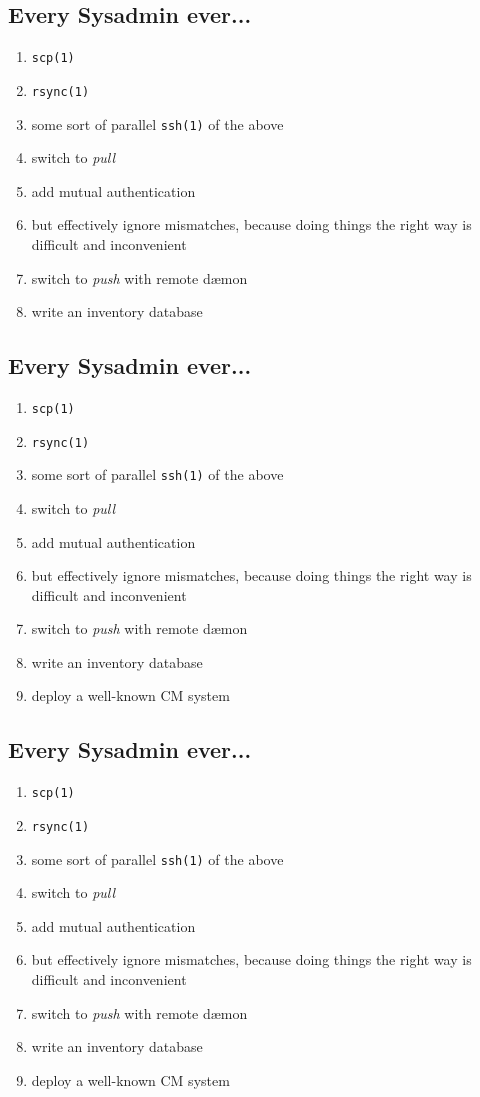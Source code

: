 \documentclass[xga]{xdvislides}
\begin{document}
\subsection{Every Sysadmin ever...}
\begin{enumerate}
	\item {\tt scp(1)}
	\item {\tt rsync(1)}
	\item some sort of parallel {\tt ssh(1)} of the above
	\item switch to {\em pull}
	\item add mutual authentication
	\item but effectively ignore mismatches, because doing things the right way is difficult and inconvenient
	\item switch to {\em push} with remote d\ae mon
	\item write an inventory database
\end{enumerate}

\subsection{Every Sysadmin ever...}
\begin{enumerate}
	\item {\tt scp(1)}
	\item {\tt rsync(1)}
	\item some sort of parallel {\tt ssh(1)} of the above
	\item switch to {\em pull}
	\item add mutual authentication
	\item but effectively ignore mismatches, because doing things the right way is difficult and inconvenient
	\item switch to {\em push} with remote d\ae mon
	\item write an inventory database
	\item deploy a well-known CM system
\end{enumerate}

\subsection{Every Sysadmin ever...}
\begin{enumerate}
	\item {\tt scp(1)}
	\item {\tt rsync(1)}
	\item some sort of parallel {\tt ssh(1)} of the above
	\item switch to {\em pull}
	\item add mutual authentication
	\item but effectively ignore mismatches, because doing things the right way is difficult and inconvenient
	\item switch to {\em push} with remote d\ae mon
	\item write an inventory database
	\item deploy a well-known CM system
\end{enumerate}
\vspace{.25in}
\end{document}
